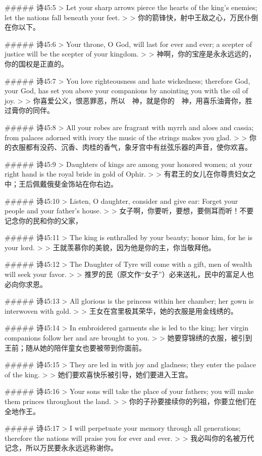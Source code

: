 ##### 诗45:5
> Let your sharp arrows pierce the hearts of the king's enemies; let the nations fall beneath your feet.
>
> 你的箭锋快，射中王敌之心，万民仆倒在你以下。


##### 诗45:6
> Your throne, O God, will last for ever and ever; a scepter of justice will be the scepter of your kingdom.
>
> 神啊，你的宝座是永永远远的，你的国权是正直的。


##### 诗45:7
> You love righteousness and hate wickedness; therefore God, your God, has set you above your companions by anointing you with the oil of joy.
>
> 你喜爱公义，恨恶罪恶，所以　神，就是你的　神，用喜乐油膏你，胜过膏你的同伴。


##### 诗45:8
> All your robes are fragrant with myrrh and aloes and cassia; from palaces adorned with ivory the music of the strings makes you glad.
>
> 你的衣服都有没药、沉香、肉桂的香气，象牙宫中有丝弦乐器的声音，使你欢喜。


##### 诗45:9
> Daughters of kings are among your honored women; at your right hand is the royal bride in gold of Ophir.
>
> 有君王的女儿在你尊贵妇女之中；王后佩戴俄斐金饰站在你右边。


##### 诗45:10
> Listen, O daughter, consider and give ear: Forget your people and your father's house.
>
> 女子啊，你要听，要想，要侧耳而听！不要记念你的民和你的父家，


##### 诗45:11
> The king is enthralled by your beauty; honor him, for he is your lord.
>
> 王就羡慕你的美貌，因为他是你的主，你当敬拜他。


##### 诗45:12
> The Daughter of Tyre will come with a gift, men of wealth will seek your favor.
>
> 推罗的民（原文作“女子”）必来送礼，民中的富足人也必向你求恩。


##### 诗45:13
> All glorious is the princess within her chamber; her gown is interwoven with gold.
>
> 王女在宫里极其荣华，她的衣服是用金线绣的。


##### 诗45:14
> In embroidered garments she is led to the king; her virgin companions follow her and are brought to you.
>
> 她要穿锦绣的衣服，被引到王前；随从她的陪伴童女也要被带到你面前。


##### 诗45:15
> They are led in with joy and gladness; they enter the palace of the king.
>
> 她们要欢喜快乐被引导，她们要进入王宫。


##### 诗45:16
> Your sons will take the place of your fathers; you will make them princes throughout the land.
>
> 你的子孙要接续你的列祖，你要立他们在全地作王。


##### 诗45:17
> I will perpetuate your memory through all generations; therefore the nations will praise you for ever and ever.
>
> 我必叫你的名被万代记念，所以万民要永永远远称谢你。


